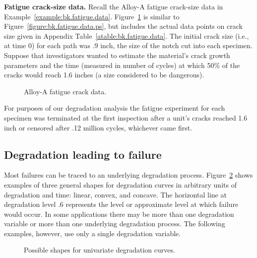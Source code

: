 \begin{example}
\label{example:bk.fatigue.data.points}
{\bfseries Fatigue crack-size data.} Recall the Alloy-A fatigue
crack-size data in Example~\ref{example:bk.fatigue.data}.
Figure~\ref{figure:bk.fatigue.data.points.ps} is similar to
Figure~\ref{figure:bk.fatigue.data.ps}, but includes the actual data
points on crack size given in
Appendix Table~\ref{atable:bk.fatigue.data}. The initial crack size (i.e., at
time 0) for each path was .9 inch, the size of the notch cut into
each specimen.  Suppose that investigators wanted to estimate the
material's crack growth parameters and the time (measured in number
of cycles) at which 50\% of the cracks would reach 1.6 inches (a
size considered to be dangerous).
\begin{figure}
\caption{Alloy-A fatigue crack data.}
\label{figure:bk.fatigue.data.points.ps}
\end{figure}
For purposes of our degradation analysis the fatigue experiment for
each specimen was terminated at the first inspection after a unit's
cracks reached 1.6 inch or censored after .12 million cycles,
whichever came first.
\end{example}

\subsection{Degradation leading to failure}
\label{section:deg.to.fail}
Most failures can be traced to an underlying degradation process.
Figure~\ref{figure:degradation.comparison.ps} shows examples of three
general shapes for degradation curves in arbitrary units
of degradation and time: linear, convex, and concave.  The horizontal
line at degradation level .6 represents the level or approximate
level at which failure would occur.  In some applications there may be
more than one degradation variable or more than one underlying
degradation process. The following examples, however, use only a
single degradation variable.
\begin{figure}
\caption{Possible shapes for univariate degradation curves.}
\label{figure:degradation.comparison.ps}
\end{figure}

